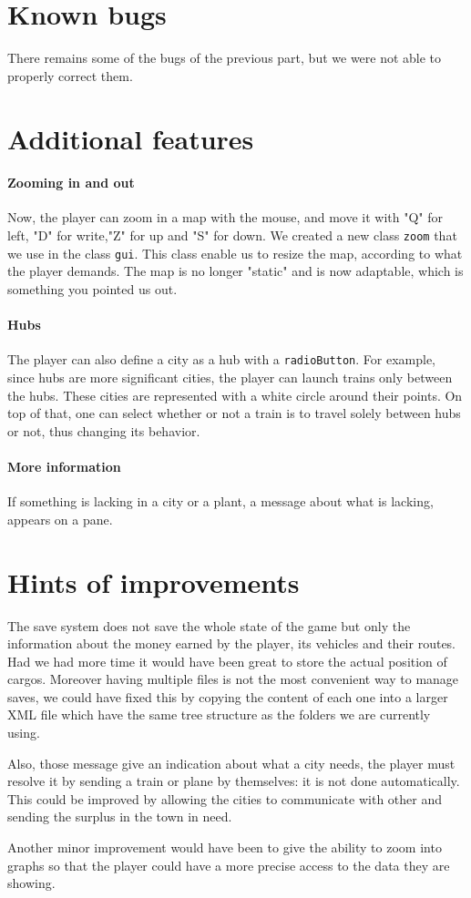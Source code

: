 \documentclass[a4paper]{article}
\begin{document}
	\section{Known bugs}
	There remains some of the bugs of the previous part, but we were not able to properly correct them.
	\section{Additional features}
	\paragraph{Zooming in and out}
	Now, the player can zoom in a map with the mouse, and move it with "Q" for left, "D" for write,"Z" for up and "S" for down. We created a new class \texttt{zoom} that we use in the class \texttt{gui}. This class enable us to resize the map, according to what the player demands. The map is no longer "static" and is now adaptable, which is something you pointed us out.
	\paragraph{Hubs}
	The player can also define a city as a hub with a \texttt{radioButton}. For example, since hubs are more significant cities, the player can launch trains only between the hubs. These cities are represented with a white circle around their points. On top of that, one can select whether or not a train is to travel solely between hubs or not, thus changing its behavior.
	\paragraph{More information}
	If something is lacking in a city or a plant, a message about what is lacking, appears on a pane.
	
	\section{Hints of improvements}
	The save system does not save the whole state of the game but only the information about the money earned by the player, its vehicles and their routes. Had we had more time it would have been great to store the actual position of cargos. Moreover having multiple files is not the most convenient way to manage saves, we could have fixed this by copying the content of each one into a larger XML file which have the same tree structure as the folders we are currently using. 
	
	Also, those message give an indication about what a city needs, the player must resolve it by sending a train or plane by themselves: it is not done automatically. This could be improved by allowing the cities to communicate with other and sending the surplus in the town in need.
	
	Another minor improvement would have been to give the ability to zoom into graphs so that the player could have a more precise access to the data they are showing.
\end{document}
